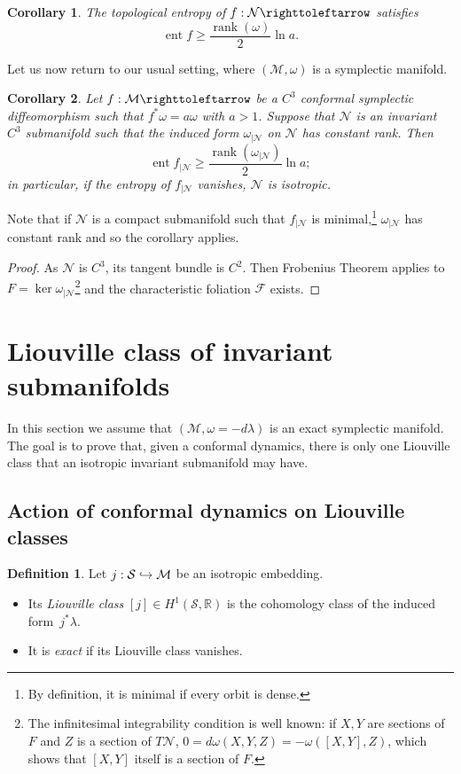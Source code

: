 \documentclass[10pt]{amsart}
\def\hto{\mathrel{\lhook\joinrel\to}}
\newtheorem{corollary}{Corollary}
\theoremstyle{definition}
\newtheorem{definition}[theorem]{Definition}
\def\R{\mathbb{R}}
\def\cF{{\mathcal F}}
\def\cM{{\mathcal M}}
\def\cN{{\mathcal N}}
\def\cS{{\mathcal S}}
\DeclareMathOperator{\ent}{ent}
\DeclareMathOperator\rank{rank}
\let\Subsection\subsection\let\Subsubsection\subsubsection
\begin{document}
\begin{corollary}
\label{cor:ent}
The topological entropy of $f : \cN \righttoleftarrow$ satisfies
\[
\ent f \geq \frac{\rank (\omega)}{2} \ln a.
\]
\end{corollary}

Let us now return to our usual setting, where $(\cM,\omega)$ is a symplectic manifold.

\begin{corollary}\label{CCisoento}
Let $f:\cM\righttoleftarrow$ be a $C^3$ conformal symplectic diffeomorphism such that $f^*\omega=a\omega$ with $a>1$. Suppose that $\cN$ is an invariant $C^3$ submanifold such that the induced form $\omega_{\vert \cN}$ on $\cN$ has constant rank. Then
\[
\ent f_{\vert\cN} \geq \frac{\rank (\omega_{\vert \cN})}{2} \ln a;
\]
in particular, if the entropy of $f_{|\cN}$ vanishes, $\cN$ is isotropic.
\end{corollary}

Note that if $\cN$ is a compact submanifold such that $f_{|\cN}$ is minimal,\footnote{By definition, it is minimal if every orbit is dense.} $\omega_{|\cN}$ has constant rank and so the corollary applies.

\begin{proof}
As $\cN$ is $C^3$, its tangent bundle is $C^2$. Then Frobenius Theorem applies to $F = \ker \omega_{\vert \cN}$\footnote{The infinitesimal integrability condition is well known: if $X,Y$ are sections of $F$ and $Z$ is a section of $T\cN$, $0 = d\omega(X,Y,Z) = - \omega([X,Y],Z)$, which shows that $[X,Y]$ itself is a section of $F$.} and the characteristic foliation $\cF$ exists.
\end{proof}

\section{Liouville class of invariant submanifolds}
\label{SLiouville}
\label{sec:exactnessdiff}

In this section we assume that $(\cM,\omega={ -d\lambda})$ is an exact symplectic manifold. The goal is to prove that, given a conformal dynamics, there is only one Liouville class that an isotropic invariant submanifold may have.

\Subsection{Action of conformal dynamics on Liouville classes}

\begin{definition}
Let $j : \cS \hto \cM$ be an isotropic embedding.
\begin{itemize}
\item
Its \emph{Liouville class} $[j] \in H^1(\cS,\R)$ is the cohomology class of the induced form~$j^*\lambda$.

\item
It is \emph{exact} if its Liouville class vanishes.
\end{itemize}
\end{definition}
\end{document}
